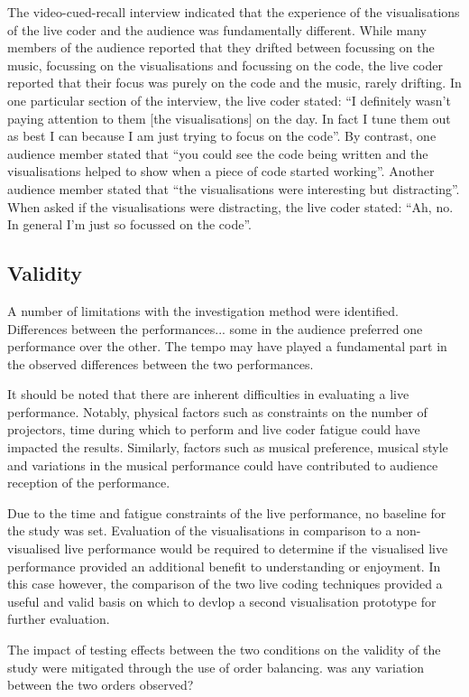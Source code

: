 The video-cued-recall interview indicated that the experience of the visualisations of the live coder and the audience was fundamentally different. While many members of the audience reported that they drifted between focussing on the music, focussing on the visualisations and focussing on the code, the live coder reported that their focus was purely on the code and the music, rarely drifting. In one particular section of the interview, the live coder stated: ``I definitely wasn't paying attention to them [the visualisations] on the day. In fact I tune them out as best I can because I am just trying to focus on the code''. By contrast, one audience member stated that ``you could see the code being written and the visualisations helped to show when a piece of code started working''. Another audience member stated that ``the visualisations were interesting but distracting''. When asked if the visualisations were distracting, the live coder stated: ``Ah, no. In general I'm just so focussed on the code''.

\subsection{Validity}

A number of limitations with the investigation method were identified. 
Differences between the performances... some in the audience preferred one performance over the other. The tempo may have played a fundamental part in the observed differences between the two performances.

It should be noted that there are inherent difficulties in evaluating a live performance. Notably, physical factors such as constraints on the number of projectors, time during which to perform and live coder fatigue could have impacted the results. Similarly, factors such as musical preference, musical style and variations in the musical performance could have contributed to audience reception of the performance. 

Due to the time and fatigue constraints of the live performance, no baseline for the study was set. Evaluation of the visualisations in comparison to a non-visualised live performance would be required to determine if the visualised live performance provided an additional benefit to understanding or enjoyment. In this case however, the comparison of the two live coding techniques provided a useful and valid basis on which to devlop a second visualisation prototype for further evaluation.

The impact of testing effects between the two conditions on the validity of the study were mitigated through the use of order balancing. {\color{red} was any variation between the two orders observed?}

